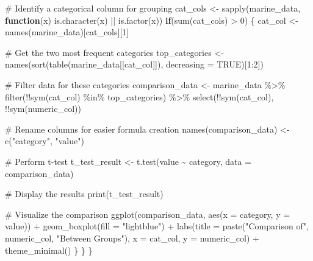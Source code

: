 \documentclass[
  letterpaper,
]{book}
\newenvironment{Shaded}{\begin{snugshade}}{\end{snugshade}}
\newcommand{\AttributeTok}[1]{\textcolor[rgb]{0.40,0.45,0.13}{#1}}
\newcommand{\CommentTok}[1]{\textcolor[rgb]{0.37,0.37,0.37}{#1}}
\newcommand{\ConstantTok}[1]{\textcolor[rgb]{0.56,0.35,0.01}{#1}}
\newcommand{\ControlFlowTok}[1]{\textcolor[rgb]{0.00,0.23,0.31}{\textbf{#1}}}
\newcommand{\DecValTok}[1]{\textcolor[rgb]{0.68,0.00,0.00}{#1}}
\newcommand{\FunctionTok}[1]{\textcolor[rgb]{0.28,0.35,0.67}{#1}}
\newcommand{\NormalTok}[1]{\textcolor[rgb]{0.00,0.23,0.31}{#1}}
\newcommand{\OtherTok}[1]{\textcolor[rgb]{0.00,0.23,0.31}{#1}}
\newcommand{\SpecialCharTok}[1]{\textcolor[rgb]{0.37,0.37,0.37}{#1}}
\newcommand{\StringTok}[1]{\textcolor[rgb]{0.13,0.47,0.30}{#1}}
\begin{document}
\begin{Shaded}
\begin{Highlighting}[]
    \CommentTok{\# Identify a categorical column for grouping}
\NormalTok{    cat\_cols }\OtherTok{\textless{}{-}} \FunctionTok{sapply}\NormalTok{(marine\_data, }\ControlFlowTok{function}\NormalTok{(x) }\FunctionTok{is.character}\NormalTok{(x) }\SpecialCharTok{||} \FunctionTok{is.factor}\NormalTok{(x))}
    \ControlFlowTok{if}\NormalTok{(}\FunctionTok{sum}\NormalTok{(cat\_cols) }\SpecialCharTok{\textgreater{}} \DecValTok{0}\NormalTok{) \{}
\NormalTok{      cat\_col }\OtherTok{\textless{}{-}} \FunctionTok{names}\NormalTok{(marine\_data)[cat\_cols][}\DecValTok{1}\NormalTok{]}
      
      \CommentTok{\# Get the two most frequent categories}
\NormalTok{      top\_categories }\OtherTok{\textless{}{-}} \FunctionTok{names}\NormalTok{(}\FunctionTok{sort}\NormalTok{(}\FunctionTok{table}\NormalTok{(marine\_data[[cat\_col]]), }\AttributeTok{decreasing =} \ConstantTok{TRUE}\NormalTok{)[}\DecValTok{1}\SpecialCharTok{:}\DecValTok{2}\NormalTok{])}
      
      \CommentTok{\# Filter data for these categories}
\NormalTok{      comparison\_data }\OtherTok{\textless{}{-}}\NormalTok{ marine\_data }\SpecialCharTok{\%\textgreater{}\%}
        \FunctionTok{filter}\NormalTok{(}\SpecialCharTok{!!}\FunctionTok{sym}\NormalTok{(cat\_col) }\SpecialCharTok{\%in\%}\NormalTok{ top\_categories) }\SpecialCharTok{\%\textgreater{}\%}
        \FunctionTok{select}\NormalTok{(}\SpecialCharTok{!!}\FunctionTok{sym}\NormalTok{(cat\_col), }\SpecialCharTok{!!}\FunctionTok{sym}\NormalTok{(numeric\_col))}
      
      \CommentTok{\# Rename columns for easier formula creation}
      \FunctionTok{names}\NormalTok{(comparison\_data) }\OtherTok{\textless{}{-}} \FunctionTok{c}\NormalTok{(}\StringTok{"category"}\NormalTok{, }\StringTok{"value"}\NormalTok{)}
      
      \CommentTok{\# Perform t{-}test}
\NormalTok{      t\_test\_result }\OtherTok{\textless{}{-}} \FunctionTok{t.test}\NormalTok{(value }\SpecialCharTok{\textasciitilde{}}\NormalTok{ category, }\AttributeTok{data =}\NormalTok{ comparison\_data)}
      
      \CommentTok{\# Display the results}
      \FunctionTok{print}\NormalTok{(t\_test\_result)}
      
      \CommentTok{\# Visualize the comparison}
      \FunctionTok{ggplot}\NormalTok{(comparison\_data, }\FunctionTok{aes}\NormalTok{(}\AttributeTok{x =}\NormalTok{ category, }\AttributeTok{y =}\NormalTok{ value)) }\SpecialCharTok{+}
        \FunctionTok{geom\_boxplot}\NormalTok{(}\AttributeTok{fill =} \StringTok{"lightblue"}\NormalTok{) }\SpecialCharTok{+}
        \FunctionTok{labs}\NormalTok{(}\AttributeTok{title =} \FunctionTok{paste}\NormalTok{(}\StringTok{"Comparison of"}\NormalTok{, numeric\_col, }\StringTok{"Between Groups"}\NormalTok{),}
             \AttributeTok{x =}\NormalTok{ cat\_col, }\AttributeTok{y =}\NormalTok{ numeric\_col) }\SpecialCharTok{+}
        \FunctionTok{theme\_minimal}\NormalTok{()}
\NormalTok{    \}}
\NormalTok{  \}}
\NormalTok{\}}
\end{Highlighting}
\end{Shaded}
\end{document}
